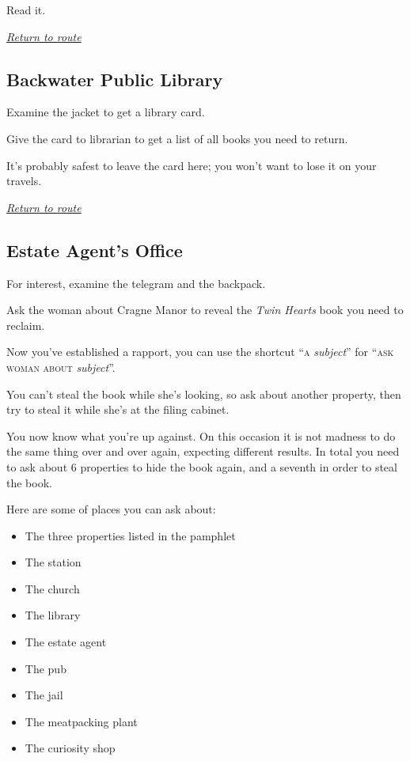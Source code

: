 \documentclass[a5paper]{extarticle}
\begin{document}
Read it.

\hyperref[sec:route-1]{\emph{Return to route}}

\newpage
\subsection{Backwater Public Library}\label{sec:sol-Public-Library-0}

Examine the jacket to get a library card.

Give the card to librarian to get a list of all books you need to return.

It's probably safest to leave the card here; you won't want to lose it on your
travels.

\hyperref[sec:route-1]{\emph{Return to route}}

\newpage
\subsection{Estate Agent's Office}\label{sec:sol-Estate-Agent's-Office}

For interest, examine the telegram and the backpack.

Ask the woman about Cragne Manor to reveal the \emph{Twin Hearts} book you need to reclaim.

Now you've established a rapport, you can use the shortcut \enquote{\textsc{a}
\emph{subject}} for \enquote{\textsc{ask woman about} \emph{subject}}.

You can't steal the book while she's looking, so ask about another property,
then try to steal it while she's at the filing cabinet.

You now know what you're up against. On this occasion it is not madness to do
the same thing over and over again, expecting different results.
In total you need to ask about 6 properties to hide the book again,
and a seventh in order to steal the book.

Here are some of places you can ask about:

\begin{multicols}{2}
\begin{itemize}
\item The three properties listed in the pamphlet
\item The station
\item The church
\item The library
\item The estate agent
\item The pub
\item The jail
\item The meatpacking plant
\item The curiosity shop
\end{itemize}
\end{multicols}
\end{document}
